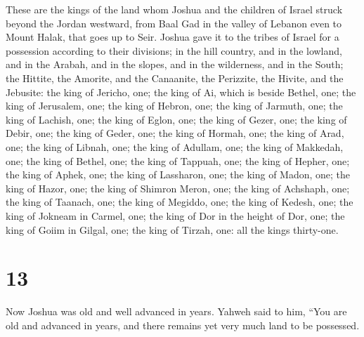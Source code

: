  These are the kings of the land whom Joshua and the
children of Israel struck beyond the Jordan westward, from Baal Gad in
the valley of Lebanon even to Mount Halak, that goes up to Seir. Joshua
gave it to the tribes of Israel for a possession according to their
divisions;  in the hill country, and in the lowland, and in
the Arabah, and in the slopes, and in the wilderness, and in the South;
the Hittite, the Amorite, and the Canaanite, the Perizzite, the Hivite,
and the Jebusite:  the king of Jericho, one; the king of Ai,
which is beside Bethel, one;  the king of Jerusalem, one;
the king of Hebron, one;  the king of Jarmuth, one; the
king of Lachish, one;  the king of Eglon, one; the king of
Gezer, one;  the king of Debir, one; the king of Geder,
one;  the king of Hormah, one; the king of Arad, one;
 the king of Libnah, one; the king of Adullam, one;
 the king of Makkedah, one; the king of Bethel, one;
 the king of Tappuah, one; the king of Hepher, one;
 the king of Aphek, one; the king of Lassharon, one;
 the king of Madon, one; the king of Hazor, one;
 the king of Shimron Meron, one; the king of Achshaph, one;
 the king of Taanach, one; the king of Megiddo, one;
 the king of Kedesh, one; the king of Jokneam in Carmel,
one;  the king of Dor in the height of Dor, one; the king
of Goiim in Gilgal, one;  the king of Tirzah, one: all the
kings thirty-one.

\hypertarget{section-12}{%
\section{13}\label{section-12}}

 Now Joshua was old and well advanced in years. Yahweh said
to him, ``You are old and advanced in years, and there remains yet very
much land to be possessed.

